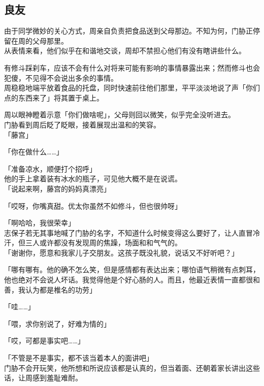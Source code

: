 \subsection{良友}

由于同学微妙的关心方式，周亲自负责把食品送到父母那边。不知为何，门胁正停留在周的父母那里。\\

从表情来看，他们似乎在和谐地交谈，周却不禁担心他们有没有瞎讲些什么。

有修斗踩刹车，应该不会有什么对将来可能有影响的事情暴露出来；然而修斗也会犯傻，不见得不会说出多余的事情。\\

周稳稳地端平放着食品的托盘，同时快速前往他们那里，平平淡淡地说了声「你们点的东西来了」将其置于桌上。

周以眼神瞪着示意「你们做啥呢」，父母则回以微笑，似乎完全没听进去。\\

门胁看到周后眨了眨眼，接着展现出温和的笑容。\\

「藤宫」

「你在做什么……」

「准备凉水，顺便打个招呼」\\

他的手上拿着装有冰水的瓶子，可见他大概不是在说谎。\\

「说起来啊，藤宫的妈妈真漂亮」

「哎呀，你嘴真甜。优太你虽然不如修斗，但也很帅呀」

「啊哈哈，我很荣幸」\\

志保子若无其事地喊了门胁的名字，不知道什么时候变得这么要好了，让人直冒冷汗，但三人或许都没有发现周的焦躁，场面和和气气的。\\

「谢谢你，愿意和我家儿子交朋友。这孩子既没礼貌，说话又不好听吧？」

「哪有哪有。他的确不怎么笑，但是感情都有表达出来；哪怕语气稍微有点刺耳，他也绝对不会说人坏话。我觉得他是个好心肠的人。而且，他最近表情一直都很和善，我认为都是椎名的功劳」

「哇……」

「喂，求你别说了，好难为情的」

「哎，可都是事实吧……」

「不管是不是事实，都不该当着本人的面讲吧」\\

门胁不会开玩笑，他所想和所说应该都是认真的，但当着面、还朝着家长讲出这些话，让周感到羞耻难耐。

